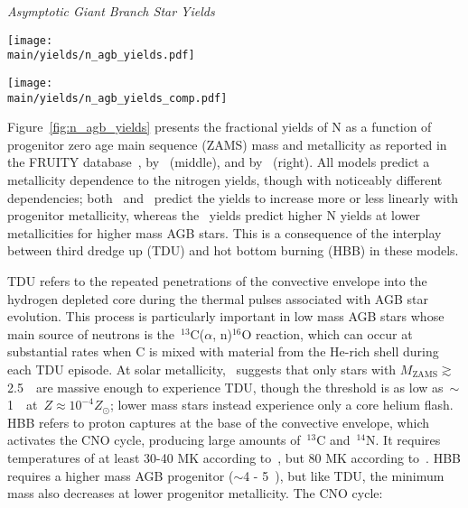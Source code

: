 \documentclass[\main/notes.tex]{subfiles}
\begin{document}
\twolineskip 
{\Large \textit{Asymptotic Giant Branch Star Yields}} 
\par\noindent 

\begin{figure*}
\centering 
\texttt{[image: \\main/yields/n\_agb\_yields.pdf]} 
\caption{
Fractional yields of N as a function of progenitor zero age main sequence mass 
at the metallicities at which~\citet{Cristallo2011} (left),~\citet{Karakas2010} 
(middle), and~\citet{Ventura2013} (right) report yields. 
} 
\label{fig:n_agb_yields} 
\end{figure*} 

\begin{figure*} 
\centering 
\texttt{[image: \\main/yields/n\_agb\_yields\_comp.pdf]} 
\caption{
The same as figure~\ref{fig:n_agb_yields}, but with the~\citet{Cristallo2011} 
(solid) and~\citet{Karakas2010} (dotted) yields plotted on the same set of axes 
for comparison. 
} 
\label{fig:n_agb_yields_comp} 
\end{figure*} 

Figure~\ref{fig:n_agb_yields} presents the fractional yields of N as a function 
of progenitor zero age main sequence (ZAMS) mass and metallicity as reported in 
the FRUITY database~\citep[][left]{Cristallo2011, Cristallo2015}, 
by~\citet{Karakas2010} (middle), and by~\citet{Ventura2013} (right). 
All models predict a metallicity dependence to the nitrogen yields, though with 
noticeably different dependencies; both~\citet{Cristallo2011, Cristallo2015} 
and~\citet{Ventura2013} predict the yields to increase more or less linearly 
with progenitor metallicity, whereas the~\citet{Karakas2010} yields predict 
higher N yields at lower metallicities for higher mass AGB stars. 
This is a consequence of the interplay between third dredge up (TDU) and 
hot bottom burning (HBB) in these models. 
\par 
TDU refers to the repeated penetrations of the convective envelope 
into the hydrogen depleted core during the thermal pulses associated with AGB 
star evolution. 
This process is particularly important in low mass AGB stars whose main source 
of neutrons is the~$^{13}$C($\alpha$, n)$^{16}$O reaction, which can occur at 
substantial rates when C is mixed with material from the He-rich shell during 
each TDU episode. 
At solar metallicity,~\citet{Karakas2010} suggests that only stars with 
$M_\text{ZAMS}\gtrsim$2.5~\msun~are massive enough to experience TDU, though 
the threshold is as low as~$\sim$1~\msun~at~$Z \approx 10^{-4}Z_\odot$; lower 
mass stars instead experience only a core helium flash. 
HBB refers to proton captures at the base of the convective envelope, which 
activates the CNO cycle, producing large amounts of~$^{13}$C and~$^{14}$N. 
It requires temperatures of at least 30-40 MK according to~\citet{Ventura2013}, 
but 80 MK according to~\citet{Cristallo2015}. 
HBB requires a higher mass AGB progenitor ($\sim$4 - 5~\msun), but like TDU, 
the minimum mass also decreases at lower progenitor metallicity. 
The CNO cycle: 
\end{document}
